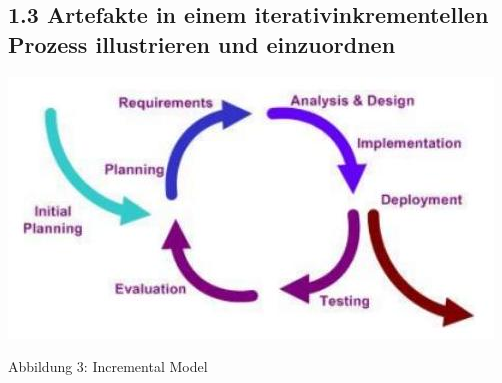 \subsection*{1.3 Artefakte in einem iterativinkrementellen Prozess illustrieren und einzuordnen}
\begin{center}
\includegraphics[width=\linewidth]{images/2024_12_29_0d1d7b5551ea1b4b41bdg-02(1)}
\end{center}

Abbildung 3: Incremental Model